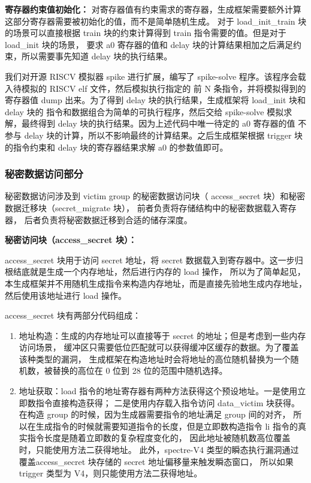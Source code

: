 \textbf{寄存器约束值初始化：}
对寄存器值有约束需求的寄存器，生成框架需要额外计算这部分寄存器需要被初始化的值，而不是简单随机生成。
对于 load\_init\_train 块的场景可以直接根据 train 块的约束计算得到 train 指令需要的值。但是对于 load\_init 块的场景，
要求 a0 寄存器的值和 delay 块的计算结果相加之后满足约束，所以需要事先知道 delay 块的执行结果。\par

我们对开源 RISCV 模拟器 spike 进行扩展，编写了 spike-solve 程序。该程序会载入待模拟的 RISCV elf 文件，然后模拟执行指定的
前 N 条指令，并将模拟得到的寄存器值 dump 出来。为了得到 delay 块的执行结果，生成框架将 load\_init 块和 delay 块的
指令和数据组合为简单的可执行程序，然后交给 spike-solve 模拟求解，最终得到 delay 块的执行结果。因为上述代码中唯一待定的 a0 寄存器的值
不参与 delay 块的计算，所以不影响最终的计算结果。之后生成框架根据 trigger 块的指令约束和 delay 块的寄存器结果求解 a0 的参数值即可。

\subsubsection{秘密数据访问部分}

秘密数据访问涉及到 victim group 的秘密数据访问块（ access\_secret 块）和秘密数据迁移块（secret\_migrate 块），
前者负责将存储结构中的秘密数据载入寄存器，
后者负责将秘密数据迁移到合适的储存深度。\par

\textbf{秘密访问块（access\_secret 块）：}\par
access\_secret 块用于访问 secret 地址，将 secret 数据载入到寄存器中。这一步归根结底就是生成一个内存地址，然后进行内存的 load 操作，
所以为了简单起见，本生成框架并不用随机生成指令来构造内存地址，而是直接先验地生成内存地址，然后使用该地址进行 load 操作。\par

access\_secret 块有两部分代码组成：
\begin{enumerate}
    \item 地址构造：生成的内存地址可以直接等于 secret 的地址；但是考虑到一些内存访问场景，
缓冲区只需要低位匹配就可以获得缓冲区缓存的数据。为了覆盖该种类型的漏洞，
生成框架在构造地址时会将地址的高位随机替换为一个随机数，被替换的高位在 0 位到 28 位的范围中随机选择。\par
    \item 地址获取：load 指令的地址寄存器有两种方法获得这个预设地址。一是使用立即数指令直接构造获得；
二是使用内存载入指令访问 data\_victim 块获得。在构造 group 的时候，因为生成器需要指令的地址满足 group 间的对齐，
所以在生成指令的时候就需要知道指令的长度，但是立即数构造指令 li 指令的真实指令长度是随着立即数的复杂程度变化的，
因此地址被随机数高位覆盖时，只能使用方法二获得地址。
此外，spectre-V4 类型的瞬态执行漏洞通过覆盖access\_secret 块存储的 secret 地址偏移量来触发瞬态窗口，
所以如果 trigger 类型为 V4，则只能使用方法二获得地址。\par
\end{enumerate}

